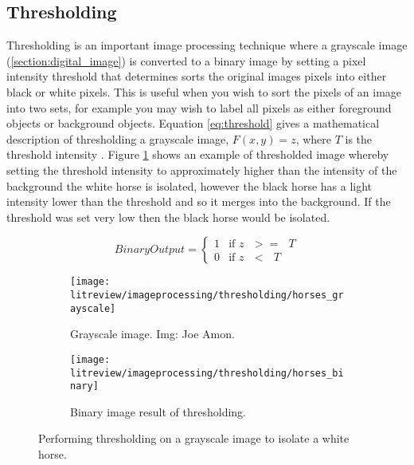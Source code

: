 \subsection{Thresholding}
\label{subsection:thresholding}
Thresholding is an important image processing technique where a grayscale image (\ref{section:digital_image}) is converted to a binary image by setting a pixel intensity threshold that determines sorts the original images pixels into either black or white pixels. This is useful when you wish to sort the pixels of an image into two sets, for example you may wish to label all pixels as either foreground objects or background objects. Equation \ref{eq:threshold} gives a mathematical description of thresholding a grayscale image, $F(x,y) = z$, where $T$ is the threshold intensity \cite{alg_apps}. Figure \ref{fig:threshex} shows an example of thresholded image whereby setting the threshold intensity to approximately higher than the intensity of the background the white horse is isolated, however the black horse has a light intensity lower than the threshold and so it merges into the background. If the threshold was set very low then the black horse would be isolated.

\begin{equation}
  Binary Output = 
  \begin{cases}
    1 & \text{if $z$ $>=$ $T$} \\
    0 & \text{if $z$ $<$  $T$}
  \end{cases}
  \label{eq:threshold}
\end{equation}

\begin{figure}[H]
	\centering
	    \begin{subfigure}[b]{0.45\linewidth}
      		\centering\texttt{[image: litreview/imageprocessing/thresholding/horses\_grayscale]}
      		\caption{Grayscale image. Img: Joe Amon.}
    	\end{subfigure}
    	\begin{subfigure}[b]{0.45\linewidth}
      		\centering\texttt{[image: litreview/imageprocessing/thresholding/horses\_binary]}
      		\caption{Binary image result of thresholding.}
    	\end{subfigure}
    	\caption{Performing thresholding on a grayscale image to isolate a white horse.}
    	\label{fig:threshex}
\end{figure}
